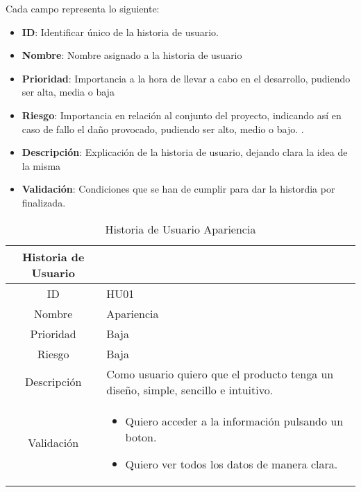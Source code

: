 \newpage
Cada campo representa lo siguiente:
\begin{itemize}
	\item \textbf{ID}: Identificar único de la historia de usuario.
	\item \textbf{Nombre}: Nombre asignado a la historia de usuario
	\item \textbf{Prioridad}: Importancia a la hora de llevar a cabo en el desarrollo, pudiendo ser alta, media o baja
	\item \textbf{Riesgo}: Importancia en relación al conjunto del proyecto, indicando así en caso de fallo el daño provocado, pudiendo ser alto, medio o bajo. .
	\item \textbf{Descripción}: Explicación de la historia de usuario, dejando clara la idea de la misma
	\item \textbf{Validación}: Condiciones que se han de cumplir para dar la histordia por finalizada.
\end{itemize}


\begin{table}[h]
	\begin{center}
		\begin{tabular}{| c | p{9cm} |}
			\hline
			
			Historia de Usuario &  \\ \hline
			
			
			ID & HU01 \\
			Nombre & Apariencia \\
			Prioridad & Baja \\
			Riesgo & Baja \\
			Descripción & Como usuario quiero que el producto tenga un diseño, simple, sencillo e intuitivo. \\
			Validación & \begin{itemize}
							\item Quiero acceder a la información pulsando un boton.
							\item Quiero ver todos los datos de manera clara.
						\end{itemize} \\ \hline
		\end{tabular}
		\caption{Historia de Usuario Apariencia}
		\label{tab:historia-usuario-01}
	\end{center}
\end{table}

